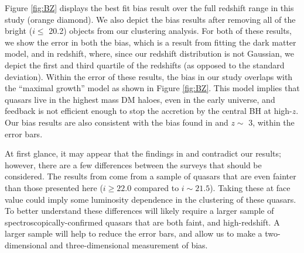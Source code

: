 \documentclass[apj, numberedappendix]{emulateapj}
\begin{document}
Figure \ref{fig:BZ} displays the best fit bias result over the full redshift range in this study (orange diamond). We also depict the bias results after removing all of the bright ($i \leq$ 20.2) objects from our clustering analysis. For both of these results, we show the error in both the bias, which is a result from fitting the dark matter model, and in redshift, where, since our redshift distribution is not Gaussian, we depict the first and third quartile of the redshifts (as opposed to the standard deviation). Within the error of these results, the bias in our study overlaps with the ``maximal growth'' model as shown in Figure \ref{fig:BZ}. This model implies that quasars live in the highest mass DM haloes, even in the early universe, and feedback is not efficient enough to stop the accretion by the central BH at high-$z$. Our bias results are also consistent with the bias found in \citet{Shen2007} and $z \sim$ 3, within the error bars.

At first glance, it may appear that the findings in \citet{He2017} and \citet{Eft2015} contradict our results; however, there are a few differences between the surveys that should be considered. The results from \citet{He2017} come from a sample of quasars that are even fainter than those presented here ($i\geq 22.0$ compared to $i\sim21.5$). Taking these at face value could imply some luminosity dependence in the clustering of these quasars. To better understand these differences will likely require a larger sample of spectroscopically-confirmed quasars that are both faint, and high-redshift. A larger sample will help to reduce the error bars, and allow us to make a two-dimensional and three-dimensional measurement of bias.
\end{document}
